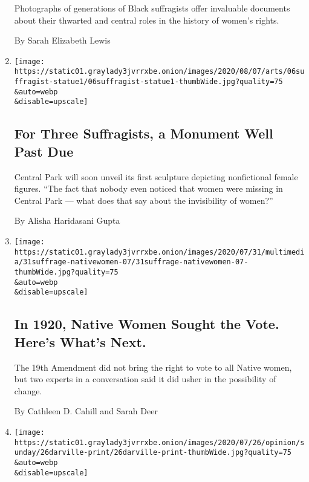 \begin{enumerate}
  Photographs of generations of Black suffragists offer invaluable
  documents about their thwarted and central roles in the history of
  women's rights.

  By Sarah Elizabeth Lewis
\item
  \href{/2020/08/06/arts/design/suffragist-19th-amendment-central-park.html}{}

  \texttt{[image: https://static01.graylady3jvrrxbe.onion/images/2020/08/07/arts/06suffragist-statue1/06suffragist-statue1-thumbWide.jpg?quality=75\\\&auto=webp\\\&disable=upscale]}

  \hypertarget{for-three-suffragists-a-monument-well-past-due}{%
  \subsection{For Three Suffragists, a Monument Well Past
  Due}\label{for-three-suffragists-a-monument-well-past-due}}

  Central Park will soon unveil its first sculpture depicting
  nonfictional female figures. ``The fact that nobody even noticed that
  women were missing in Central Park --- what does that say about the
  invisibility of women?''

  By Alisha Haridasani Gupta
\item
  \href{/2020/07/31/style/19th-amendment-native-womens-suffrage.html}{}

  \texttt{[image: https://static01.graylady3jvrrxbe.onion/images/2020/07/31/multimedia/31suffrage-nativewomen-07/31suffrage-nativewomen-07-thumbWide.jpg?quality=75\\\&auto=webp\\\&disable=upscale]}

  \hypertarget{in-1920-native-women-sought-the-vote-heres-whats-next}{%
  \subsection{In 1920, Native Women Sought the Vote. Here's What's
  Next.}\label{in-1920-native-women-sought-the-vote-heres-whats-next}}

  The 19th Amendment did not bring the right to vote to all Native
  women, but two experts in a conversation said it did usher in the
  possibility of change.

  By Cathleen D. Cahill and Sarah Deer
\item
  \href{/2020/07/23/sunday-review/reopening-schools-coronavirus.html}{}

  \texttt{[image: https://static01.graylady3jvrrxbe.onion/images/2020/07/26/opinion/sunday/26darville-print/26darville-print-thumbWide.jpg?quality=75\\\&auto=webp\\\&disable=upscale]}


\end{enumerate}
